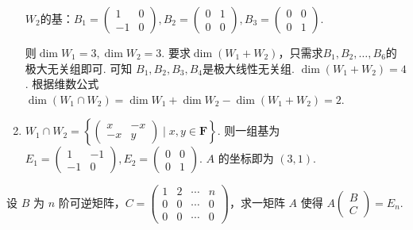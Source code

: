 \begin{exercise}
\begin{exgroup}
\begin{answer}
\begin{enumerate}
                    $W_2$的基：$B_1=\begin{pmatrix}1&0\\-1&0\end{pmatrix},B_2=\begin{pmatrix}0&1\\0&0\end{pmatrix},B_3=\begin{pmatrix}0&0\\0&1\end{pmatrix}$.

                    则$\dim W_1=3,\dim W_2=3$. 要求$\dim  (W_1+W_2)$，只需求$B_1,B_2,\ldots ,B_6$的极大无关组即可. 可知 $B_1,B_2,B_3,B_4$是极大线性无关组.	$\dim(W_1+W_2)=4$. 根据维数公式$\dim (W_1\cap W_2)=\dim W_1+\dim W_2-\dim (W_1+W_2)=2$.

                \item $W_1\cap W_2=\left\{\begin{pmatrix}x&-x\\-x&y\end{pmatrix} \mid x,y\in \mathbf{F}\right\}$. 则一组基为$E_1=\begin{pmatrix}1&-1\\-1&0\end{pmatrix},E_2=\begin{pmatrix}0&0\\0&1\end{pmatrix}$. $A$ 的坐标即为 $(3,1)$.
            \end{enumerate}
        \end{answer}

        \item 设 $B$ 为 $n$ 阶可逆矩阵，$C = \begin{pmatrix}
            1 & 2 & \cdots & n \\
            0 & 0 & \cdots & 0 \\
            0 & 0 & \cdots & 0
        \end{pmatrix}$，求一矩阵 $A$ 使得 $A\begin{pmatrix}
            B \\ C
        \end{pmatrix} = E_n$.
        \begin{answer}

        \end{answer}
    \end{exgroup}


\end{exercise}
